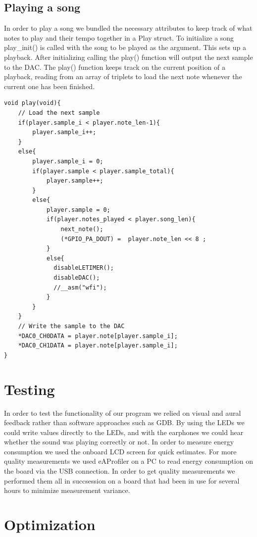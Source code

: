 \subsection{Playing a song}
In order to play a song we bundled the necessary attributes to keep track of what notes to play and their tempo together in a Play struct. To initialize a song play\_init() is called with the song to be played as the argument. This sets up a playback. After initializing calling the play() function will output the next sample to the DAC.
The play() function keeps track on the current position of a playback, reading from an array of triplets to load the next note whenever the current one has been finished. \\

\begin{minipage}{\textwidth}
\begin{lstlisting}
void play(void){
	// Load the next sample
	if(player.sample_i < player.note_len-1){			
		player.sample_i++;								
	}
	else{								
		player.sample_i = 0;
		if(player.sample < player.sample_total){
   			player.sample++;				
		}
		else{							
			player.sample = 0;
			if(player.notes_played < player.song_len){
				next_note();
				(*GPIO_PA_DOUT) =  player.note_len << 8 ;		
			}			 
			else{
			  disableLETIMER();
			  disableDAC();
			  //__asm("wfi");
			}
		}
	}
	// Write the sample to the DAC
	*DAC0_CH0DATA = player.note[player.sample_i];
	*DAC0_CH1DATA = player.note[player.sample_i];
}
\end{lstlisting}
\end{minipage}



\section{Testing}
In order to test the functionality of our program we relied on visual and aural feedback rather than software approaches such as GDB. By using the LEDs we could write values directly to the LEDs, and with the earphones we could hear whether the sound was playing correctly or not. In order to measure energy consumption we used the onboard LCD screen for quick estimates. For more quality measurements we used eAProfiler on a PC to read energy consumption on the board via the USB connection. In order to get quality measurements we performed them all in succsession on a board that had been in use for several hours to minimize measurement variance. 

\section{Optimization}


